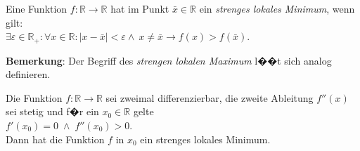 \begin{Definition} \lb
  Eine Funktion $f:\mathbb{R} \rightarrow \mathbb{R}$ hat im Punkt $\bar{x}\in \mathbb{R}$
  ein \emph{strenges lokales Minimum}, wenn gilt:
  \\[0.2cm]
  \hspace*{1.3cm}
  $\exists \varepsilon \in \mathbb{R}_+: \forall x \in \mathbb{R}: 
  |x - \bar{x}| < \varepsilon \wedge\ x \not= \bar{x} \rightarrow f(x) > f(\bar{x})$.
\eod
\end{Definition}

\noindent
\textbf{Bemerkung}:  Der Begriff des \emph{strengen lokalen Maximum} l��t sich analog definieren.

\begin{Satz} \label{satz:minimum}
  Die Funktion $f:\mathbb{R} \rightarrow \mathbb{R}$ sei zweimal differenzierbar, die
  zweite Ableitung $f''(x)$ sei stetig und f�r
  ein $x_0 \in \mathbb{R}$ gelte
  \\[0.2cm]
  \hspace*{1.3cm}
  $f'(x_0) = 0 \;\wedge\; f''(x_0) > 0$.
  \\[0.2cm]
  Dann hat die Funktion $f$ in $x_0$ ein strenges lokales Minimum.
\end{Satz}

